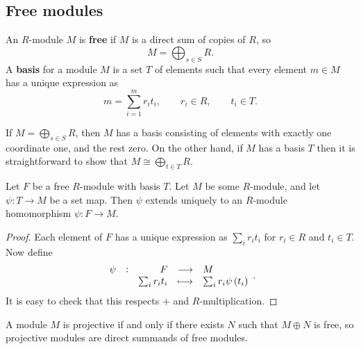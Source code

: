 \subsection{Free modules}

\begin{definition}
An $ R $-module $ M $ is \textbf{free} if $ M $ is a direct sum of copies of $ R $, so
$$ M = \bigoplus_{s \in S} R. $$
A \textbf{basis} for a module $ M $ is a set $ T $ of elements such that every element $ m \in M $ has a unique expression as
$$ m = \sum_{i = 1}^m r_it_i, \qquad r_i \in R, \qquad t_i \in T. $$
\end{definition}

If $ M = \bigoplus_{s \in S} R $, then $ M $ has a basis consisting of elements with exactly one coordinate one, and the rest zero. On the other hand, if $ M $ has a basis $ T $ then it is straightforward to show that $ M \cong \bigoplus_{t \in T} R $.

\begin{proposition}
Let $ F $ be a free $ R $-module with basis $ T $. Let $ M $ be some $ R $-module, and let $ \psi : T \to M $ be a set map. Then $ \psi $ extends uniquely to an $ R $-module homomorphism $ \psi : F \to M $.
\end{proposition}

\begin{proof}
Each element of $ F $ has a unique expression as $ \sum_i r_it_i $ for $ r_i \in R $ and $ t_i \in T $. Now define
$$ \function[\psi]{F}{M}{\sum_i r_it_i}{\sum_i r_i\psi\br{t_i}}. $$
It is easy to check that this respects $ + $ and $ R $-multiplication.
\end{proof}

\begin{proposition}
A module $ M $ is projective if and only if there exists $ N $ such that $ M \oplus N $ is free, so projective modules are direct summands of free modules.
\end{proposition}

